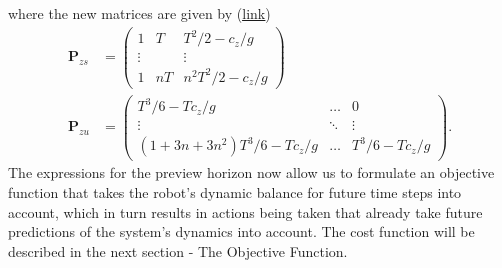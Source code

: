 where the new matrices are given by (\href{https://github.com/mhubii/nmpc_pattern_generator/blob/5a213044c927dc6aac9f7e32ce1e5fb472cd67bb/libs/pattern_generator/src/base_generator.cpp#L420}{\underline{link}})
\begin{align}
	\bm{P}_{zs} &= \begin{pmatrix}
	1 & T & T^2/2 - c_z/g \\
	\vdots & & \vdots \\
	1 & nT & n^2T^2/2 - c_z/g
	\end{pmatrix} \\ 
	\bm{P}_{zu} &= \begin{pmatrix}
	T^3/6 - Tc_z/g & \dots & 0 \\
	\vdots & \ddots & \vdots \\
	(1+3n+3n^2)T^3/6 - Tc_z/g & \dots & T^3/6-Tc_z/g
	\end{pmatrix}.
\end{align}
The expressions for the preview horizon now allow us to formulate an objective function that takes the robot's dynamic balance for future time steps into account, which in turn results in actions being taken that already take future predictions of the system's dynamics into account. The cost function will be described in the next section - The Objective Function.
